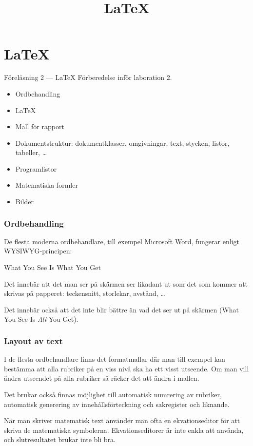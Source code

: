 
\title{\LaTeX}
\section{\LaTeX}

\begin{frame}[fragile=singleslide]
\label{latex}
\begin{block}{\centering\Large Föreläsning 2 --- \LaTeX}
Förberedelse inför laboration 2.

\begin{itemize}
\item Ordbehandling
\item \LaTeX
\item Mall för rapport
\item Dokumentstruktur: dokumentklasser, omgivningar, text, stycken, listor, tabeller, \ldots
\item Programlistor
\item Matematiska formler
\item Bilder
\end{itemize}
\end{block}
\end{frame} 

\begin{frame}[fragile=singleslide]
\frametitle{Ordbehandling}
De flesta moderna ordbehandlare, till exempel Microsoft Word,  fungerar 
enligt \textsc{WYSIWYG}-principen:

\blankline
\begin{center}
What You See Is What You Get
\end{center}

\blankline
Det innebär att det man ser på skärmen ser likadant ut som det som kommer
att skrivas på papperet: teckensnitt, storlekar, avstånd, \ldots

Det innebär också att det inte blir bättre än vad det ser ut
på skärmen (What You See Is \emph{All} You Get).
\end{frame} 

\begin{frame}[fragile=singleslide]
\frametitle{Layout av text}
I de flesta ordbehandlare finns det
formatmallar där man till exempel kan bestämma att alla rubriker på
en viss nivå ska ha ett visst utseende. Om man vill ändra
utseendet på alla rubriker så räcker det att ändra i mallen.

\blankline
Det brukar också finnas möjlighet till automatisk numrering av 
rubriker, automatisk generering av innehållsförteckning och 
sakregister och liknande. 

\blankline
När man skriver matematisk text använder man ofta en ekvationseditor
för att skriva de matematiska symbolerna. Ekvationseditorer är inte
enkla att använda, och slutresultatet brukar inte bli bra.
\end{frame} 

